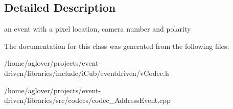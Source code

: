 \subsection{Detailed Description}
an event with a pixel location, camera number and polarity 

The documentation for this class was generated from the following files\+:\begin{DoxyCompactItemize}
\item 
/home/aglover/projects/event-\/driven/libraries/include/i\+Cub/eventdriven/v\+Codec.\+h\item 
/home/aglover/projects/event-\/driven/libraries/src/codecs/codec\+\_\+\+Address\+Event.\+cpp\end{DoxyCompactItemize}
